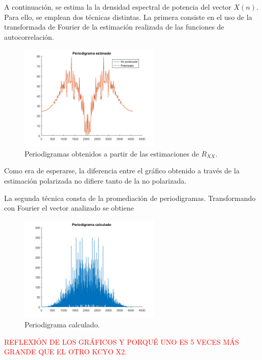 A continuación, se estima la la densidad espectral de potencia del vector $X(n)$. Para ello, se emplean dos técnicas distintas. La primera consiste en el uso de la transformada de Fourier de la estimación realizada de las funciones de autocorrelación.
\begin{figure}[H]
\centering
	\includegraphics[width=0.6\textwidth, trim = {0 0 0 0.725cm},clip]{./ImagenesEjercicio2/period-est.png}
	\caption{Periodigramas obtenidos a partir de las estimaciones de $R_{XX}$.}
	\label{fig:period-est}
\end{figure}

Como era de esperarse, la diferencia entre el gráfico obtenido a través de la estimación polarizada no difiere tanto de la no polarizada.

La segunda técnica consta de la promediación de periodigramas. Transformando con Fourier el vector analizado se obtiene
\begin{figure}[H]
\centering
	\includegraphics[width=0.6\textwidth, trim = {0 0 0 0.725cm},clip]{./ImagenesEjercicio2/period-calc.png}
	\caption{Periodigrama calculado.}
	\label{fig:period-calc}
\end{figure}

\textcolor{red}{REFLEXIÓN DE LOS GRÁFICOS Y PORQUÉ UNO ES 5 VECES MÁS GRANDE QUE EL OTRO KCYO X2.}


